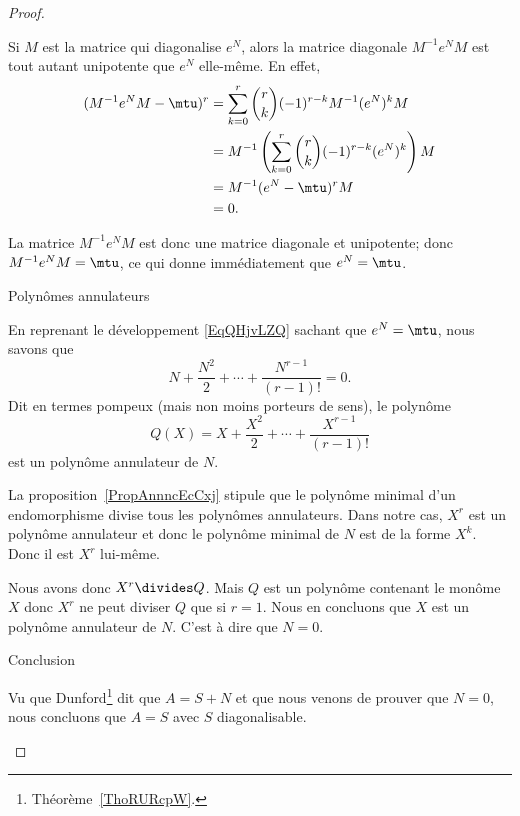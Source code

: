 \begin{proof}
\begin{subproof}
            Si \( M\) est la matrice qui diagonalise \( e^N\), alors la matrice diagonale \( M^{-1}e^NM\) est tout autant unipotente que \( e^N\) elle-même. En effet,
            \begin{subequations}
                \begin{align}
                    (M^{-1}e^NM-\mtu)^r&=\sum_{k=0}^r\binom{ r }{ k }(-1)^{r-k}M^{-1}(e^N)^kM\\
                    &=M^{-1}\left( \sum_{k=0}^r\binom{ r }{ k }(-1)^{r-k}(e^N)^k \right)M\\
                    &=M^{-1}(e^N-\mtu)^rM\\
                    &=0.
                \end{align}
            \end{subequations}

            La matrice \( M^{-1}e^NM\) est donc une matrice diagonale et unipotente; donc \( M^{-1}e^NM=\mtu\), ce qui donne immédiatement que \( e^N=\mtu\).

        \item[Polynômes annulateurs]

            En reprenant le développement \eqref{EqQHjvLZQ} sachant que \( e^N=\mtu\), nous savons que
            \begin{equation}
                N+\frac{ N^2 }{2}+\cdots +\frac{ N^{r-1} }{ (r-1)! }=0.
            \end{equation}
            Dit en termes pompeux (mais non moins porteurs de sens), le polynôme
            \begin{equation}
                Q(X)=X+\frac{ X^2 }{2}+\cdots +\frac{ X^{r-1} }{ (r-1)! }
            \end{equation}
            est un polynôme annulateur de \( N\).

            La proposition~\ref{PropAnnncEcCxj} stipule que le polynôme minimal d'un endomorphisme divise tous les polynômes annulateurs. Dans notre cas, \( X^r\) est un polynôme annulateur et donc le polynôme minimal de \( N\) est de la forme \( X^k\). Donc il est \( X^r\) lui-même.

            Nous avons donc \( X^r\divides Q\). Mais \( Q\) est un polynôme contenant le monôme \( X\) donc \( X^r\) ne peut diviser \( Q\) que si \( r=1\). Nous en concluons que \( X\) est un polynôme annulateur de \( N\). C'est à dire que \( N=0\).

        \item[Conclusion]

            Vu que Dunford\footnote{Théorème~\ref{ThoRURcpW}.} dit que \( A=S+N\) et que nous venons de prouver que \( N=0\), nous concluons que \( A=S\) avec \( S\) diagonalisable.

    \end{subproof}
\end{proof}

